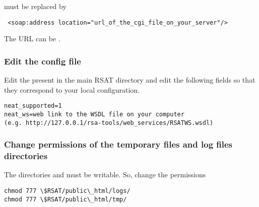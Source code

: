 \documentclass{book}
\begin{document}
must be replaced by

\begin{footnotesize}
\begin{verbatim}
 <soap:address location="url_of_the_cgi_file_on_your_server"/>
\end{verbatim}
\end{footnotesize}

The URL can be .

\subsubsection{Edit the \neat config file}

Edit the  present in the main RSAT directory and edit the following fields so that they correspond to your local configuration.

\begin{footnotesize}
\begin{verbatim}
neat_supported=1
neat_ws=web link to the WSDL file on your computer
(e.g. http://127.0.0.1/rsa-tools/web_services/RSATWS.wsdl)
\end{verbatim}
\end{footnotesize}

\subsubsection{Change permissions of the temporary files and log files directories}

The directories  and  must be writable. So, change the permissions

\begin{footnotesize}
\begin{verbatim}
chmod 777 \$RSAT/public\_html/logs/
chmod 777 \$RSAT/public\_html/tmp/
\end{verbatim}
\end{footnotesize}
\end{document}
